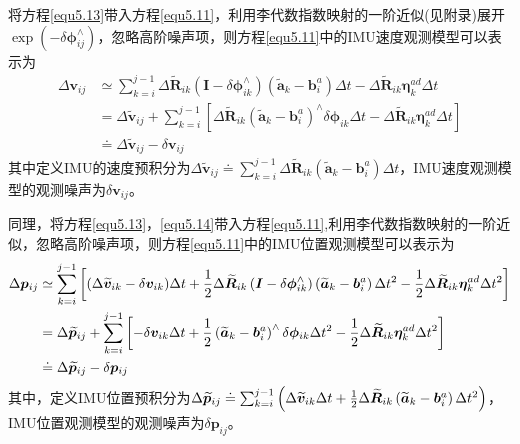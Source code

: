 将方程\eqref{equ5.13}带入方程\eqref{equ5.11}，利用李代数指数映射的一阶近似(见附录)展开$\exp \left(  -\delta \boldsymbol{\phi}_{ij}^{\wedge}  \right)$，忽略高阶噪声项，则方程\eqref{equ5.11}中的IMU速度观测模型可以表示为
\begin{equation}
\label{equ5.14}
\begin{aligned}
\Delta \boldsymbol{v}_{ij} & \simeq \sum\limits_{k=i}^{j-1} \Delta \widetilde{\boldsymbol{R}}_{ik}\left( \boldsymbol{I}-\delta \boldsymbol{\phi}_{ik}^{\wedge} \right) \left( \widetilde{\boldsymbol{a}}_k - \boldsymbol{b}_i^a \right) \Delta t -\Delta \widetilde{\boldsymbol{R}}_{ik} \boldsymbol{\eta}_k^{ad} \Delta t 
\\ 
& = \Delta \widetilde{\boldsymbol{v}}_{ij} + \sum\limits_{k=i}^{j-1} \left[ \Delta \widetilde{\boldsymbol{R}}_{ik} \left( \widetilde{\boldsymbol{a}}_k - \boldsymbol{b}_i^a \right)^{\wedge} \delta \boldsymbol{\phi}_{ik} \Delta t - \Delta \widetilde{\boldsymbol{R}}_{ik} \boldsymbol{\eta}_k^{ad} \Delta t \right] \\ 
& \doteq  \Delta \widetilde{\boldsymbol{v}}_{ij} - \delta \boldsymbol{v}_{ij}
\end{aligned}
\end{equation}
其中定义IMU的速度预积分为$\Delta \widetilde{\boldsymbol{v}}_{ij} \doteq \sum_{k=i}^{j-1} \Delta \widetilde{\boldsymbol{R}}_{ik} \left( \widetilde{\boldsymbol{a}}_k - \boldsymbol{b}_i^a \right) \Delta t $，IMU速度观测模型的观测噪声为$\delta \boldsymbol{v}_{ij}$。

同理，将方程\eqref{equ5.13}，\eqref{equ5.14}带入方程\eqref{equ5.11},利用李代数指数映射的一阶近似，忽略高阶噪声项，则方程\eqref{equ5.11}中的IMU位置观测模型可以表示为
\begin{equation}
\label{equ5.15}
\begin{aligned} 
\Delta \boldsymbol{p}_{ij} & \simeq \sum\limits_{k=i}^{j-1} \left[ (\Delta \widetilde{\boldsymbol{v}}_{ik} - \delta \boldsymbol{v}_{ik}) \Delta t + {1 \over 2} \Delta \widetilde{\boldsymbol{R}}_{ik}\left( \boldsymbol{I}-\delta \boldsymbol{\phi}_{ik}^{\wedge} \right) \left( \widetilde{\boldsymbol{a}}_k - \boldsymbol{b}_i^a  \right) \Delta t^2 - {1 \over 2} \Delta \widetilde{\boldsymbol{R}}_{ik} \boldsymbol{\eta}_k^{ad} \Delta t^2 \right] 
\\ 
& =  \Delta \widetilde{\boldsymbol{p}}_{ij} + \sum\limits_{k=i}^{j-1} \left[ -\delta \boldsymbol{v}_{ik} \Delta t + {1 \over 2} \left( \widetilde{\boldsymbol{a}}_k - \boldsymbol{b}_i^a  \right) ^{\wedge} \delta \boldsymbol{\phi}_{ik} \Delta t^2 - {1 \over 2} \Delta \widetilde{\boldsymbol{R}}_{ik} \boldsymbol{\eta}_k^{ad} \Delta t^2 \right] \\ 
& \doteq \Delta \widetilde{\boldsymbol{p}}_{ij} - \delta \boldsymbol{p}_{ij}
\end{aligned}
\end{equation}
其中，定义IMU位置预积分为$\Delta \widetilde{\boldsymbol{p}}_{ij} \doteq \sum_{k=i}^{j-1} \left( \Delta \widetilde{\boldsymbol{v}}_{ik} \Delta t +  {1 \over 2} \Delta \widetilde{\boldsymbol{R}}_{ik} \left( \widetilde{\boldsymbol{a}}_k - \boldsymbol{b}_i^a  \right) \Delta t^2 \right)$，IMU位置观测模型的观测噪声为$\delta \boldsymbol{p}_{ij}$。

